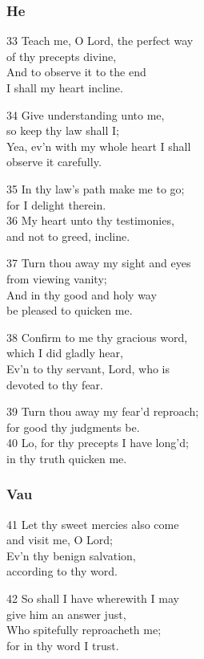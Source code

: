 \begin{multicols}{3}
\subsubsection*{He}

33 Teach me, O Lord, the perfect way\\
of thy precepts divine,\\
And to observe it to the end\\
I shall my heart incline.

34 Give understanding unto me,\\
so keep thy law shall I;\\
Yea, ev’n with my whole heart I shall\\
observe it carefully.

35 In thy law’s path make me to go;\\
for I delight therein.\\
36 My heart unto thy testimonies,\\
and not to greed, incline.

37 Turn thou away my sight and eyes\\
from viewing vanity;\\
And in thy good and holy way\\
be pleased to quicken me.

38 Confirm to me thy gracious word,\\
which I did gladly hear,\\
Ev’n to thy servant, Lord, who is\\
devoted to thy fear.

39 Turn thou away my fear’d reproach;\\
for good thy judgments be.\\
40 Lo, for thy precepts I have long’d;\\
in thy truth quicken me.

\subsubsection*{Vau}

41 Let thy sweet mercies also come\\
and visit me, O Lord;\\
Ev’n thy benign salvation,\\
according to thy word.

42 So shall I have wherewith I may\\
give him an answer just,\\
Who spitefully reproacheth me;\\
for in thy word I trust.


\end{multicols}
